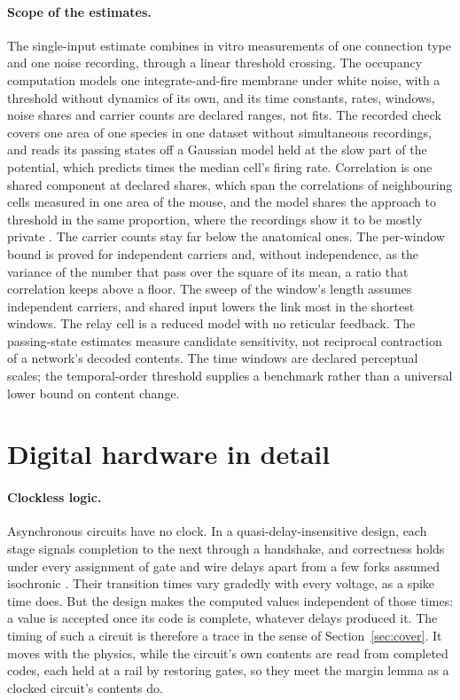 \documentclass[12pt]{article}
\begin{document}
\paragraph{Scope of the estimates.} The single-input estimate combines in vitro
measurements of one connection type and one noise recording, through a linear
threshold crossing. The occupancy computation models one integrate-and-fire
membrane under white noise, with a threshold without dynamics of its own, and
its time constants, rates, windows, noise shares and carrier counts are declared
ranges, not fits. The recorded check covers one area of one species in one
dataset without simultaneous recordings, and reads its passing states off a
Gaussian model held at the slow part of the potential, which predicts
\uRecRateRatioMed{} times the median cell's firing rate. Correlation is one shared component at declared shares,
which span the correlations of neighbouring cells measured in one area of the
mouse, and the model shares the approach to threshold in the same proportion,
where the recordings show it to be mostly private \citep{poulet2008}. The
carrier counts stay far below the anatomical ones. The per-window bound is
proved for independent carriers and, without independence, as the variance of
the number that pass over the square of its mean, a ratio that correlation keeps
above a floor. The sweep of the window's length assumes independent carriers,
and shared input lowers the link most in the shortest windows. The relay cell
is a reduced model with no reticular feedback. The passing-state estimates
measure candidate sensitivity, not reciprocal contraction of a network's
decoded contents. The time windows are declared perceptual scales; the
temporal-order threshold supplies a benchmark rather than a universal lower
bound on content change.

\section{Digital hardware in detail}
\label{app:digital}

\paragraph{Clockless logic.} Asynchronous circuits have no clock. In a
quasi-delay-insensitive design, each stage signals completion to the next
through a handshake, and correctness holds under every assignment of gate and
wire delays apart from a few forks assumed isochronic \citep{martin2006}. Their
transition times vary gradedly with every voltage, as a spike time does. But
the design makes the computed values independent of those times: a value is
accepted once its code is complete, whatever delays produced it. The timing of
such a circuit is therefore a trace in the sense of Section~\ref{sec:cover}. It
moves with the physics, while the circuit's own contents are read from completed
codes, each held at a rail by restoring gates, so they meet the margin lemma as
a clocked circuit's contents do.
\end{document}

